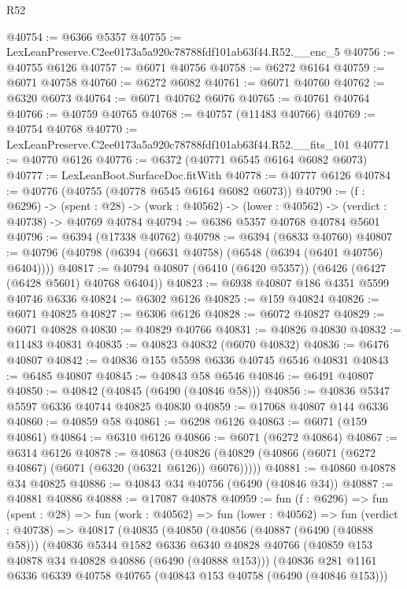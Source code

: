 \begin{lexlean}{R52}
\begin{coremodule}
@40754 := @6366 @5357
@40755 := LexLeanPreserve.C2ee0173a5a920c78788fdf101ab63f44.R52.__enc_5
@40756 := @40755 @6126
@40757 := @6071 @40756
@40758 := @6272 @6164
@40759 := @6071 @40758
@40760 := @6272 @6082
@40761 := @6071 @40760
@40762 := @6320 @6073
@40764 := @6071 @40762 @6076
@40765 := @40761 @40764
@40766 := @40759 @40765
@40768 := @40757 (@11483 @40766)
@40769 := @40754 @40768
@40770 := LexLeanPreserve.C2ee0173a5a920c78788fdf101ab63f44.R52.__fits_101
@40771 := @40770 @6126
@40776 := @6372 (@40771 @6545 @6164 @6082 @6073)
@40777 := LexLeanBoot.SurfaceDoc.fitWith
@40778 := @40777 @6126
@40784 := @40776 (@40755 (@40778 @6545 @6164 @6082 @6073))
@40790 := (f : @6296) ->
  (spent : @28) -> (work : @40562) -> (lower : @40562) -> (verdict : @40738) -> @40769 @40784
@40794 := @6386 @5357 @40768 @40784 @5601
@40796 := @6394 (@17338 @40762)
@40798 := @6394 (@6833 @40760)
@40807 := @40796 (@40798 (@6394 (@6631 @40758) (@6548 (@6394 (@6401 @40756) @6404))))
@40817 := @40794 @40807 (@6410 (@6420 @5357)) (@6426 (@6427 (@6428 @5601) @40768 @6404))
@40823 := @6938 @40807 @186 @4351 @5599 @40746 @6336
@40824 := @6302 @6126
@40825 := @159 @40824
@40826 := @6071 @40825
@40827 := @6306 @6126
@40828 := @6072 @40827
@40829 := @6071 @40828
@40830 := @40829 @40766
@40831 := @40826 @40830
@40832 := @11483 @40831
@40835 := @40823 @40832 (@6070 @40832)
@40836 := @6476 @40807
@40842 := @40836 @155 @5598 @6336 @40745 @6546 @40831
@40843 := @6485 @40807
@40845 := @40843 @58 @6546
@40846 := @6491 @40807
@40850 := @40842 (@40845 (@6490 (@40846 @58)))
@40856 := @40836 @5347 @5597 @6336 @40744 @40825 @40830
@40859 := @17068 @40807 @144 @6336
@40860 := @40859 @58
@40861 := @6298 @6126
@40863 := @6071 (@159 @40861)
@40864 := @6310 @6126
@40866 := @6071 (@6272 @40864)
@40867 := @6314 @6126
@40878 := @40863
    (@40826 (@40829 (@40866 (@6071 (@6272 @40867) (@6071 (@6320 (@6321 @6126)) @6076)))))
@40881 := @40860 @40878 @34 @40825
@40886 := @40843 @34 @40756 (@6490 (@40846 @34))
@40887 := @40881 @40886
@40888 := @17087 @40878
@40959 := fun (f : @6296) =>
  fun (spent : @28) =>
  fun (work : @40562) =>
  fun (lower : @40562) =>
  fun (verdict : @40738) =>
  @40817
    (@40835
      (@40850
        (@40856
          (@40887 (@6490 (@40888 @58)))
          (@40836
            @5344
            @1582
            @6336
            @6340
            @40828
            @40766
            (@40859 @153 @40878 @34 @40828 @40886 (@6490 (@40888 @153)))
            (@40836
              @281
              @1161
              @6336
              @6339
              @40758
              @40765
              (@40843 @153 @40758 (@6490 (@40846 @153)))

\end{coremodule}
\end{lexlean}
